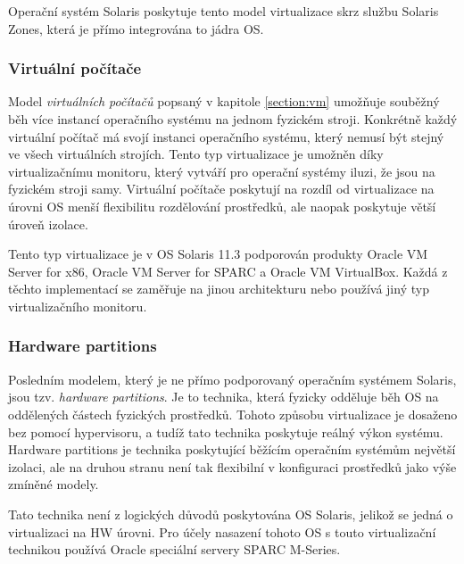 Operační systém Solaris poskytuje tento model virtualizace skrz službu Solaris Zones, která je přímo integrována to jádra OS.

\subsubsection{Virtuální počítače}

Model \textit{virtuálních počítačů} popsaný v kapitole \ref{section:vm} umožňuje souběžný běh více instancí operačního systému na jednom fyzickém stroji. Konkrétně každý virtuální počítač má svojí instanci operačního systému, který nemusí být stejný ve všech virtuálních strojích. Tento typ virtualizace je
umožněn díky virtualizačnímu monitoru, který vytváří pro operační systémy iluzi, že jsou na fyzickém stroji samy. Virtuální počítače poskytují na rozdíl od virtualizace na úrovni OS menší flexibilitu rozdělování prostředků, ale naopak poskytuje větší úroveň izolace.

Tento typ virtualizace je v OS Solaris 11.3 podporován produkty Oracle VM Server for x86, Oracle VM Server for SPARC a Oracle VM VirtualBox. Každá z těchto implementací se zaměřuje na jinou architekturu nebo používá jiný typ virtualizačního monitoru.

\subsubsection{Hardware partitions}

Posledním modelem, který je ne přímo podporovaný operačním systémem Solaris, jsou tzv. \textit{hardware partitions}. Je to technika, která fyzicky odděluje běh OS na oddělených částech fyzických prostředků. Tohoto způsobu virtualizace je dosaženo
bez pomocí hypervisoru, a tudíž tato technika poskytuje reálný výkon systému. Hardware partitions je technika poskytující běžícím operačním systémům největší izolaci, ale na druhou stranu není tak flexibilní v konfiguraci prostředků jako výše zmíněné modely.

Tato technika není z logických důvodů poskytována OS Solaris, jelikož se jedná o virtualizaci na HW úrovni. Pro účely nasazení tohoto OS s touto virtualizační technikou používá Oracle speciální servery  SPARC M-Series.